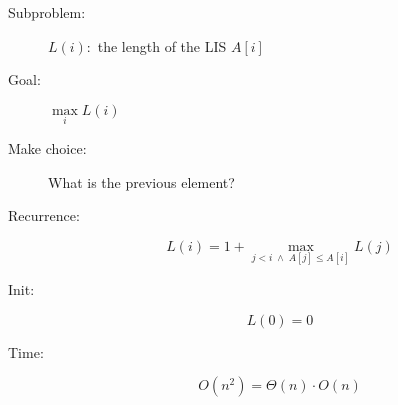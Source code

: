 \begin{frame}{}
  \begin{description}
    \item[Subproblem:] $L(i):$ the length of the LIS  $A[i]$
    \item[Goal:] $\max\limits_{i} L(i)$
      \pause
    \item[Make choice:] What is the previous element?
    \item[Recurrence:] 
      \[
	L(i) = 1 + \max_{j < i \;\land\; A[j] \le A[i]} L(j)
      \]
      \pause
    \item[Init:]
      \[
	L(0) = 0
      \]
    \item[Time:] 
      \[
	O(n^2) = \Theta(n) \cdot O(n)
      \]
  \end{description}
\end{frame}
